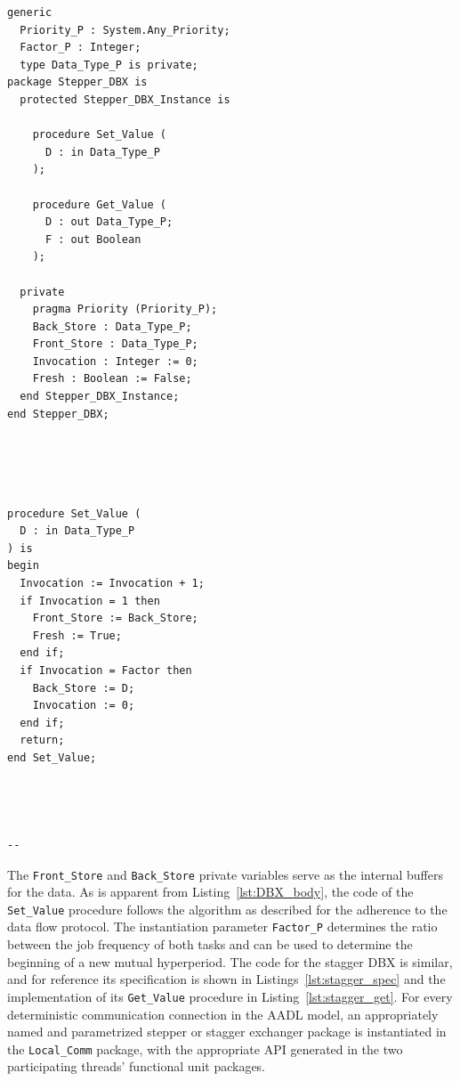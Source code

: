 \begin{minipage}{0.45\linewidth}
\lstset{language=ada}
\begin{lstlisting}[label=lst:DBX_spec, caption=Specification of the Stepper DBX connector]
generic
  Priority_P : System.Any_Priority;
  Factor_P : Integer;
  type Data_Type_P is private;
package Stepper_DBX is
  protected Stepper_DBX_Instance is
    
    procedure Set_Value (
      D : in Data_Type_P
    );
    
    procedure Get_Value (
      D : out Data_Type_P;
      F : out Boolean
    );

  private
    pragma Priority (Priority_P);
    Back_Store : Data_Type_P;
    Front_Store : Data_Type_P;
    Invocation : Integer := 0;
    Fresh : Boolean := False;
  end Stepper_DBX_Instance;
end Stepper_DBX;
\end{lstlisting}
\end{minipage}
\hspace{5mm}
\begin{minipage}{0.45\linewidth}
\lstset{language=ada}
\begin{lstlisting}[label=lst:DBX_body, caption=Stepper DBX connector
    \texttt{Set\_Value} procedure]




procedure Set_Value (
  D : in Data_Type_P
) is
begin
  Invocation := Invocation + 1;
  if Invocation = 1 then
    Front_Store := Back_Store;
    Fresh := True;
  end if;
  if Invocation = Factor then
    Back_Store := D;
    Invocation := 0;
  end if;
  return;
end Set_Value;




--
\end{lstlisting}
\end{minipage}

The \texttt{Front\_Store} and \texttt{Back\_Store} private variables
serve as the internal buffers for the data. As is apparent from
Listing~\ref{lst:DBX_body}, the code of the \texttt{Set\_Value}
procedure follows the algorithm as described for the adherence to the
data flow protocol. The instantiation parameter \texttt{Factor\_P}
determines the ratio between the job frequency of both tasks and can
be used to determine the beginning of a new mutual hyperperiod. The
code for the stagger DBX is similar, and for reference its
specification is shown in Listings~\ref{lst:stagger_spec} and the
implementation of its \texttt{Get\_Value} procedure in
Listing~\ref{lst:stagger_get}. For every deterministic communication
connection in the AADL model, an appropriately named and parametrized
stepper or stagger exchanger package is instantiated in the
\texttt{Local\_Comm} package, with the appropriate API generated in
the two participating threads' functional unit packages.

